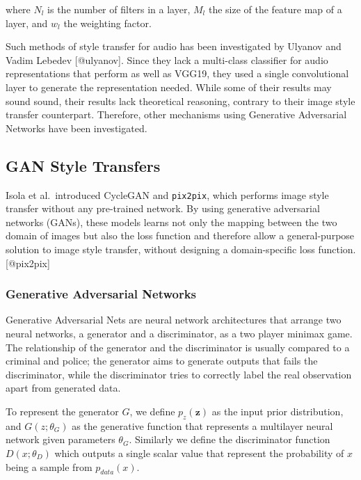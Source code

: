 \documentclass[]{article}
\begin{document}
where \(N_l\) is the number of filters in a layer, \(M_l\) the size of
the feature map of a layer, and \(w_l\) the weighting factor.

Such methods of style transfer for audio has been investigated by
Ulyanov and Vadim Lebedev {[}@ulyanov{]}. Since they lack a multi-class
classifier for audio representations that perform as well as VGG19, they
used a single convolutional layer to generate the representation needed.
While some of their results may sound sound, their results lack
theoretical reasoning, contrary to their image style transfer
counterpart. Therefore, other mechanisms using Generative Adversarial
Networks have been investigated.

\hypertarget{gan-style-transfers}{%
\subsection{GAN Style Transfers}\label{gan-style-transfers}}

Isola et al.~introduced CycleGAN and \texttt{pix2pix}, which performs
image style transfer without any pre-trained network. By using
generative adversarial networks (GANs), these models learns not only the
mapping between the two domain of images but also the loss function and
therefore allow a general-purpose solution to image style transfer,
without designing a domain-specific loss function. {[}@pix2pix{]}

\hypertarget{generative-adversarial-networks}{%
\subsubsection{Generative Adversarial
Networks}\label{generative-adversarial-networks}}

Generative Adversarial Nets are neural network architectures that
arrange two neural networks, a generator and a discriminator, as a two
player minimax game. The relationship of the generator and the
discriminator is usually compared to a criminal and police; the
generator aims to generate outputs that fails the discriminator, while
the discriminator tries to correctly label the real observation apart
from generated data.

To represent the generator \(G\), we define \(p_z(\mathbf{z})\) as the
input prior distribution, and \(G(z; \theta_G)\) as the generative
function that represents a multilayer neural network given parameters
\(\theta_G\). Similarly we define the discriminator function
\(D(x; \theta_D)\) which outputs a single scalar value that represent
the probability of \(x\) being a sample from \(p_{data}(x)\).
\end{document}
